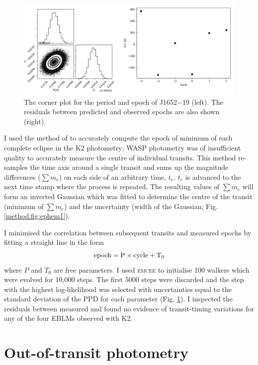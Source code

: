 \begin{figure}
    \centering
    \includegraphics[scale=0.4]{7-images/1652-19_ephem_2.png}
    \caption{The corner plot for the period and epoch of J1652$-$19 (left). The residuals between predicted and observed epochs are also shown (right).}
    \label{method:fig:ephem2}
\end{figure}

 I used the method of \citet{1956BAN....12..327K} to accurately compute the epoch of minimum of each complete eclipse in the K2 photometry; WASP photometry was of insufficient quality to accurately measure the centre of individual transits. This method re-samples the time axis around a single transit and sums up the magnitude differences ($\sum m_e$) on each side of an arbitrary time, $t_{e}$. $t_{e}$ is advanced to the next time stamp where the process is repeated. The resulting values of $\sum m_e$ will form an inverted Gaussian which was fitted to determine the centre of the transit (minimum of $\sum m_e$) and the uncertainty (width of the Gaussian; Fig. \ref{method:fig:ephem1}).
 
 I minimised the correlation between subsequent transits and measured epochs by fitting a straight line in the form
 \begin{equation}
     \rm epoch = P \times \rm cycle + T_0
 \end{equation}
 where $P$ and $T_0$ are free parameters. I used \textsc{emcee} to initialise 100 walkers which were evolved for 10,000 steps. The first 5000 steps were discarded and the step with the highest log-likelihood was selected with uncertainties equal to the standard deviation of the PPD for each parameter (Fig. \ref{method:fig:ephem2}). I inspected the residuals between measured and found no evidence of transit-timing variations for any of the four EBLMs observed with K2.


\section{Out-of-transit photometry}\label{methods:photometric_variation}



